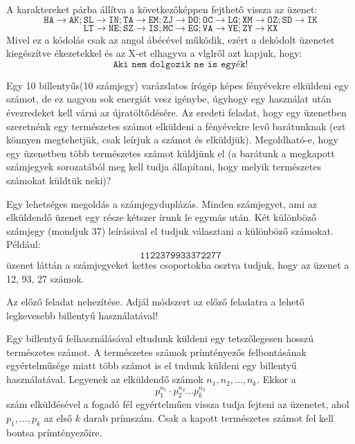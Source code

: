 \begin{solution}
A karaktereket párba állítva a következőképpen fejthető vissza az
üzenet: 
\[
\texttt{HA}\to\texttt{AK};\texttt{SL}\to\texttt{IN};\texttt{TA}\to\texttt{EM};\texttt{ZJ}\to\texttt{DO};\texttt{OC}\to\texttt{LG};\texttt{XM}\to\texttt{OZ};\texttt{SD}\to\texttt{IK}
\]
\[
\texttt{LT}\to\texttt{NE};\texttt{SZ}\to\texttt{IS};\texttt{MC}\to\texttt{EG};\texttt{VA}\to\texttt{YE};\texttt{ZY}\to\texttt{KX}
\]
Mivel ez a kódolás csak az angol ábécével működik, ezért a dekódolt
üzenetet kiegészítve ékezetekkel és az X-et elhagyva a vlglről azt
kapjuk, hogy: 
\[
\texttt{Aki nem dolgozik ne is egyék!}
\]
\end{solution}
\begin{problem}
Egy 10 billentyűs(10 számjegy) varázslatos írógép képes fényévekre
elküldeni egy számot, de ez nagyon sok energiát vesz igénybe, úgyhogy
egy használat után évezredeket kell várni az újratöltődésére. Az eredeti
feladat, hogy egy üzenetben szeretnénk egy természetes számot elküldeni
a fényévekre levő barátunknak (ezt könnyen megtehetjük, csak leírjuk
a számot és elküldjük). Megoldható-e, hogy egy üzenetben több természetes
számot küldjünk el (a barátunk a megkapott számjegyek sorozatából
meg kell tudja állapítani, hogy melyik természetes számokat küldtük
neki)? 
\end{problem}

\begin{solution}
Egy lehetséges megoldás a számjegyduplázás. Minden számjegyet, ami
az elküldendő üzenet egy része kétszer írunk le egymás után. Két különböző
számjegy (mondjuk 37) leírásával el tudjuk választani a különböző
számokat. Például: 
\[
\texttt{1122379933372277}
\]
üzenet láttán a számjegyeket kettes csoportokba osztva tudjuk, hogy
az üzenet a 12, 93, 27 számok. 
\end{solution}
\begin{problem}
Az előző feladat nehezítése. Adjál módszert az előző feladatra a lehető
legkevesebb billentyű használatával! 
\end{problem}

\begin{solution}
Egy billentyű felhasználásával eltudunk küldeni egy tetszőlegesen
hosszú természetes számot. A természetes számok prímtényezős felbontásának
egyértelműsége miatt több számot is el tudunk küldeni egy billentyű
használatával. Legyenek az elküldendő számok $n_{1},n_{2},\dots,n_{k}$.
Ekkor a 
\[
p_{1}^{n_{1}}\cdot p_{2}^{n_{2}}\dots p_{k}^{n_{k}}
\]
szám elküldésével a fogadó fél egyértelműen vissza tudja fejteni az
üzenetet, ahol $p_{1},\dots,p_{k}$ az első $k$ darab prímszám. Csak
a kapott természetes számot fel kell bontsa prímtényezőire. 
\end{solution}

